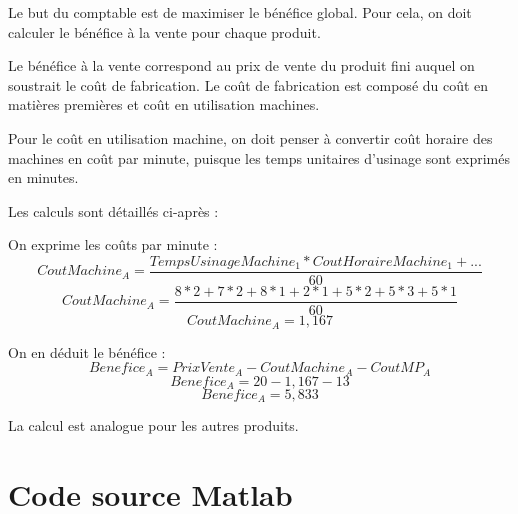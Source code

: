 \documentclass[a4paper,10pt]{article}
\begin{document}
Le but du comptable est de maximiser le bénéfice global. Pour cela, on doit
calculer le bénéfice à la vente pour chaque produit.

Le bénéfice à la vente correspond au prix de vente du produit fini auquel
on soustrait le coût de fabrication. Le coût de fabrication est composé du
coût en matières premières et coût en utilisation machines.

Pour le coût en utilisation machine, on doit penser à convertir coût horaire
des machines en coût par minute, puisque les temps unitaires d'usinage sont
exprimés en minutes.

Les calculs sont détaillés ci-après :

On exprime les coûts par minute :
$$ CoutMachine_A = \frac{TempsUsinageMachine_1*CoutHoraireMachine_1 + ...}{60} $$
$$ CoutMachine_A = \frac{8*2+7*2+8*1+2*1+5*2+5*3+5*1}{60} $$
$$ CoutMachine_A = 1,167 $$

On en déduit le bénéfice :
$$ Benefice_A = PrixVente_A - CoutMachine_A - CoutMP_A $$
$$ Benefice_A = 20 - 1,167 - 13 $$
$$ Benefice_A = 5,833 $$

La calcul est analogue pour les autres produits.


\newpage
\section{Code source Matlab}

\end{document}
